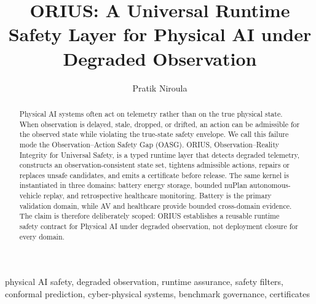\documentclass[10pt,journal]{IEEEtran}
\title{ORIUS: A Universal Runtime Safety Layer for Physical AI under Degraded Observation}
\author{Pratik Niroula}
\date{}
\begin{document}
\maketitle

\begin{abstract}
Physical AI systems often act on telemetry rather than on the true physical state.
When observation is delayed, stale, dropped, or drifted, an action can be admissible for
the observed state while violating the true-state safety envelope. We call this failure
mode the Observation--Action Safety Gap (OASG). ORIUS, Observation--Reality Integrity
for Universal Safety, is a typed runtime layer that detects degraded telemetry,
constructs an observation-consistent state set, tightens admissible actions, repairs or
replaces unsafe candidates, and emits a certificate before release. The same kernel is
instantiated in three domains: battery energy storage, bounded nuPlan autonomous-vehicle
replay, and retrospective healthcare monitoring. Battery is the primary validation
domain, while AV and healthcare provide bounded cross-domain evidence. The claim is
therefore deliberately scoped: ORIUS establishes a reusable runtime safety contract for
Physical AI under degraded observation, not deployment closure for every domain.
\end{abstract}

\begin{IEEEkeywords}
physical AI safety, degraded observation, runtime assurance, safety filters, conformal
prediction, cyber-physical systems, benchmark governance, certificates
\end{IEEEkeywords}















\balance


\end{document}
